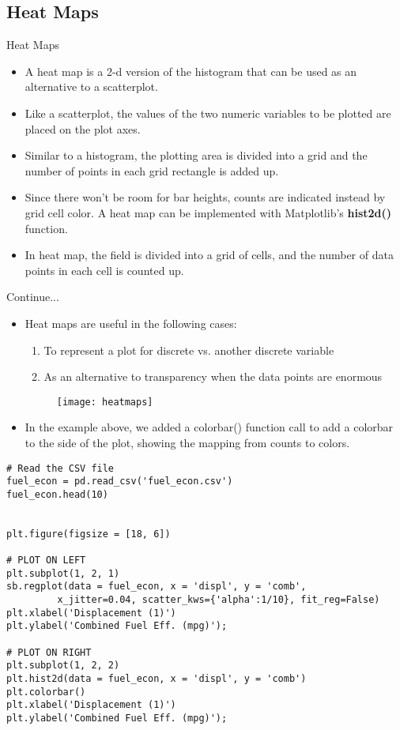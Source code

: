 \documentclass[12pt]{beamer}
\begin{document}
\subsection{Heat Maps}
    \begin{frame}{Heat Maps}
    	\begin{itemize}
    		\item A heat map is a 2-d version of the histogram that can be used as an alternative to a scatterplot.
    		\item Like a scatterplot, the values of the two numeric variables to be plotted are placed on the plot axes.
    		\item Similar to a histogram, the plotting area is divided into a grid and the number of points in each grid rectangle is added up.
    		\item Since there won't be room for bar heights, counts are indicated instead by grid cell color. A heat map can be implemented with Matplotlib's \textbf{hist2d()} function.
    		\item In heat map, the field is divided into a grid of cells, and the number of data points in each cell is counted up. 
    	\end{itemize}
    \end{frame}
    \begin{frame}{Continue...}
    	\begin{itemize}
    		\item Heat maps are useful in the following cases:
    		\begin{enumerate}
    			\item To represent a plot for discrete vs. another discrete variable
    			\item As an alternative to transparency when the data points are enormous
    		\end{enumerate} 
    \begin{figure}
    \centering
    \texttt{[image: heatmaps]}
    \end{figure}
    \item In the example above, we added a colorbar() function call to add a colorbar to the side of the plot, showing the mapping from counts to colors.
    	\end{itemize}
    \end{frame}
    \begin{frame}[fragile]{}
    	\fontsize{10}{1}
    	\begin{verbatim}
# Read the CSV file
fuel_econ = pd.read_csv('fuel_econ.csv')
fuel_econ.head(10)


plt.figure(figsize = [18, 6])

# PLOT ON LEFT
plt.subplot(1, 2, 1)
sb.regplot(data = fuel_econ, x = 'displ', y = 'comb', 
         x_jitter=0.04, scatter_kws={'alpha':1/10}, fit_reg=False)
plt.xlabel('Displacement (1)')
plt.ylabel('Combined Fuel Eff. (mpg)');

# PLOT ON RIGHT
plt.subplot(1, 2, 2)
plt.hist2d(data = fuel_econ, x = 'displ', y = 'comb')
plt.colorbar()
plt.xlabel('Displacement (1)')
plt.ylabel('Combined Fuel Eff. (mpg)');
    	\end{verbatim}
    \end{frame}
\end{document}
